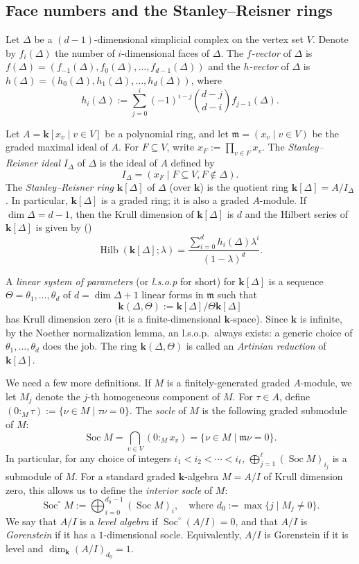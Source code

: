 \documentclass[ALCO,ThmDefs,Unicode,epreuves]{cedram}
\DeclareMathOperator{\Hilb}{Hilb}
\DeclareMathOperator{\Soc}{Soc}
\newcommand{\field}{\mathbf{k}}
\newcommand{\mideal}{\ensuremath{\mathfrak{m}}}
\begin{document}

\subsection{Face numbers and the Stanley--Reisner rings} Let $\Delta$ be a $(d-1)$-dimensional simplicial complex on the vertex set $V$. Denote by $f_i(\Delta)$ the number of $i$-dimensional faces of $\Delta$.
The \emph{$f$-vector} of $\Delta$ is $f(\Delta)=(f_{-1}(\Delta), f_0(\Delta),\ldots, f_{d-1}(\Delta))$ and the \emph{$h$-vector} of $\Delta$ is $h(\Delta)=(h_0(\Delta), h_1(\Delta), \ldots, h_d(\Delta))$, where 
\[h_i(\Delta):=\sum_{j=0}^i (-1)^{i-j}\binom{d-j}{d-i}f_{j-1}(\Delta).\]

Let $A=\field[x_v \mid v\in V]$ be a polynomial ring, and let $\mideal=(x_v \mid v\in V)$ be the graded maximal ideal of $A$. For $F\subseteq V$, write $x_F:=\prod_{v\in F} x_v$. The \emph{Stanley--Reisner ideal} $I_\Delta$ of $\Delta$ is the ideal of $A$ defined by 
\[
I_\Delta=(x_F \mid F\subseteq V, F\notin\Delta).\]
The \emph{Stanley--Reisner ring} $\field[\Delta]$ of $\Delta$ (over $\field$) is the quotient ring $\field[\Delta]=A/I_\Delta$. In particular, $\field[\Delta]$ is a graded ring; it is also a graded $A$-module. If $\dim\Delta=d-1$, then the Krull dimension of $\field[\Delta]$ is $d$ and the Hilbert series of $\field[\Delta]$ is given by (\cite[Chapter~II.1]{Stanley-96})
\[
\Hilb(\field[\Delta]; \lambda)=\frac{\sum_{i=0}^d h_i(\Delta)\lambda^i}{(1-\lambda)^d}.\]

A \emph{linear system of parameters} (or \emph{l.s.o.p} for short) for $\field[\Delta]$ is a sequence $\Theta=\theta_1,\ldots,\theta_d$ of $d=\dim\Delta + 1$ linear forms in $\mideal$ such that \[\field(\Delta,\Theta):= \field[\Delta]/\Theta\field[\Delta]\]
has Krull dimension zero (\ie it is a finite-dimensional $\field$-space). Since $\field$ is infinite, by the Noether normalization lemma, an l.s.o.p.~always exists: a generic choice of $\theta_1,\ldots,\theta_d$ does the job.
The ring $\field(\Delta,\Theta)$ is called an \emph{Artinian reduction} of $\field[\Delta]$. 

We need a few more definitions. If $M$ is a finitely-generated graded $A$-module, we let $M_j$ denote the $j$-th homogeneous component of $M$. For $\tau\in A$, define $(0:_M \tau):=\{\nu\in M \mid \tau\nu=0\}$. The \emph{socle} of $M$ is the following graded submodule of $M$:
\[\Soc M=\bigcap_{v\in V}(0:_M x_v)=\{\nu\in M \mid \mideal\nu=0\}.\]
In particular, for any choice of integers $i_1<i_2<\cdots<i_\ell$, $\bigoplus_{j=1}^\ell (\Soc M)_{i_j}$ is a submodule of $M$.
For a standard graded $\field$-algebra $M=A/I$ of Krull dimension zero, this allows us to define the \emph{interior socle} of $M$: 
\[
\Soc^\circ M:=\bigoplus_{i=0}^{d_0-1}(\Soc M)_i, \quad \mbox{where $d_0:=\max\{j \mid M_j\neq 0\}$}.
\]
We say that $A/I$ is a \emph{level algebra} if $\Soc^\circ(A/I)=0$, and that $A/I$ is \emph{Gorenstein} if it has a $1$-dimensional socle. Equivalently, $A/I$ is Gorenstein if it is level and $\dim_\field (A/I)_{d_0}=1$.
\end{document}
